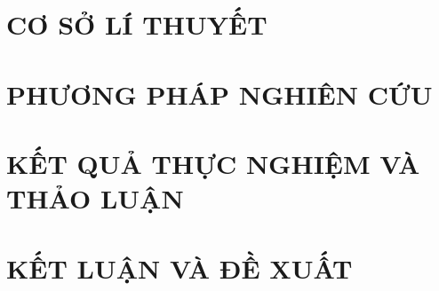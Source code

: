 \documentclass[a4paper,12pt,oneside]{report}
\begin{document}
\chapter{ CƠ SỞ LÍ THUYẾT}


\chapter{ PHƯƠNG PHÁP NGHIÊN CỨU}


\chapter{ KẾT QUẢ THỰC NGHIỆM VÀ THẢO LUẬN}


\chapter{ KẾT LUẬN VÀ ĐỀ XUẤT}









\end{document}
